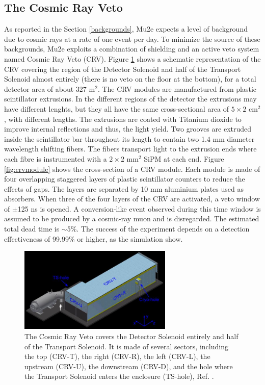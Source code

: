 \subsection{The Cosmic Ray Veto}\label{CRV}
As reported in the Section \ref{backgrounds}, Mu2e expects a level of background due to cosmic rays at a rate of one event per day. 
To minimize the source of these backgrounds, Mu2e exploits a combination of shielding and an active 
veto system named Cosmic Ray Veto (CRV). Figure \ref{fig:crv} shows a 
schematic representation of 
the CRV covering the region of the Detector Solenoid and half of the Transport Solenoid 
almost entirely (there is no veto on the floor at the bottom), for a total detector area of about 327 m$^2$.
The CRV modules are manufactured from plastic scintillator extrusions. 
In the different regions of the detector the extrusions may have different lenghts, 
but they all have the same cross-sectional area of $5 \times 2$ cm$^2$, with different lengths. The extrusions 
are coated with Titanium dioxide to improve internal reflections and thus, the light yield. 
Two grooves are extruded inside the scintillator bar throughout its length to contain two 
1.4 mm diameter wavelength shifting fibers. The fibers transport light to the extrusion 
ends where each fibre is instrumented with a $2 \times 2$ mm$^2$ SiPM at each end. Figure \ref{fig:crvmodule} 
shows the cross-section of a CRV module. Each module is made of four overlapping staggered layers 
of plastic scintillator counters to reduce the effects of gaps. The layers are separated by 10 mm aluminium plates used as absorbers. 
When three of the four layers of the CRV are activated, a veto window of $\pm$125 ns is opened. 
A conversion-like event observed during this time window is assumed to be produced by a cosmic-ray muon and is disregarded. 
The estimated total dead time is $\sim$5\%. 
The success of the experiment depends on a detection effectiveness of 99.99\% or higher, as the simulation show.

\begin{figure}[!h]
\centering
\includegraphics[width =0.65\textwidth]{figures/jpg/Crv_downstream.jpg}
\caption[The CRV features and components.]{The Cosmic Ray Veto covers the Detector Solenoid entirely and half 
of the Transport Solenoid. It is made of several sectors, including the top 
(CRV-T), the right (CRV-R), the left (CRV-L), the upstream (CRV-U), the downstream 
(CRV-D), and the hole where the Transport Solenoid enters the enclosure (TS-hole), Ref. \cite{bartoszek2015mu2e}.}
\label{fig:crv}
\end{figure}

